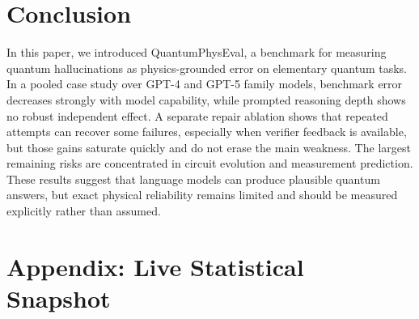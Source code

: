 \documentclass[11pt]{article}
\newcommand{\appendixsnapshot}{%
{\small
\setlength{\tabcolsep}{6pt}
\renewcommand{\arraystretch}{1.08}
\sloppy

}%
}
\begin{document}
\section{Conclusion}
In this paper, we introduced QuantumPhysEval, a benchmark for measuring quantum hallucinations as physics-grounded error on elementary quantum tasks. In a pooled case study over GPT-4 and GPT-5 family models, benchmark error decreases strongly with model capability, while prompted reasoning depth shows no robust independent effect. A separate repair ablation shows that repeated attempts can recover some failures, especially when verifier feedback is available, but those gains saturate quickly and do not erase the main weakness. The largest remaining risks are concentrated in circuit evolution and measurement prediction. These results suggest that language models can produce plausible quantum answers, but exact physical reliability remains limited and should be measured explicitly rather than assumed.

\appendix
\section*{Appendix: Live Statistical Snapshot}
\appendixsnapshot
\end{document}
